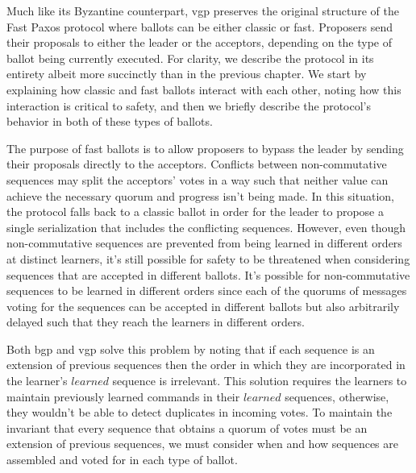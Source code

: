 Much like its Byzantine counterpart, \acrshort{vgp} preserves the original structure of the Fast Paxos protocol where ballots can be either classic or fast. Proposers send their proposals to either the leader or the acceptors, depending on the type of ballot being currently executed. For clarity, we describe the protocol in its entirety albeit more succinctly than in the previous chapter. We start by explaining how classic and fast ballots interact with each other, noting how this interaction is critical to safety, and then we briefly describe the protocol's behavior in both of these types of ballots. \par
The purpose of fast ballots is to allow proposers to bypass the leader by sending their proposals directly to the acceptors. Conflicts between non-commutative sequences may split the acceptors' votes in a way such that neither value can achieve the necessary quorum and progress isn't being made. In this situation, the protocol falls back to a classic ballot in order for the leader to propose a single serialization that includes the conflicting sequences. However, even though non-commutative sequences are prevented from being learned in different orders at distinct learners, it's still possible for safety to be threatened when considering sequences that are accepted in different ballots. It's possible for non-commutative sequences to be learned in different orders since each of the quorums of messages voting for the sequences can be accepted in different ballots but also arbitrarily delayed such that they reach the learners in different orders.\par
Both \acrshort{bgp} and \acrshort{vgp} solve this problem by noting that if each sequence is an extension of previous sequences then the order in which they are incorporated in the learner's $learned$ sequence is irrelevant. This solution requires the learners to maintain previously learned commands in their $learned$ sequences, otherwise, they wouldn't be able to detect duplicates in incoming votes. To maintain the invariant that every sequence that obtains a quorum of votes must be an extension of previous sequences, we must consider when and how sequences are assembled and voted for in each type of ballot. \par 
